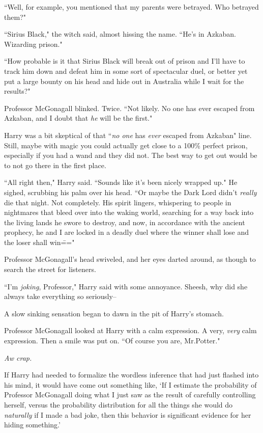 ``Well, for example, you mentioned that my parents were betrayed. Who betrayed them?"

``Sirius Black," the witch said, almost hissing the name. ``He's in Azkaban. Wizarding prison."

``How probable is it that Sirius Black will break out of prison and I'll have to track him down and defeat him in some sort of spectacular duel, or better yet put a large bounty on his head and hide out in Australia while I wait for the results?"

Professor McGonagall blinked. Twice. ``Not likely. No one has ever escaped from Azkaban, and I doubt that \emph{he} will be the first."

Harry was a bit skeptical of that ``\emph{no one} has \emph{ever} escaped from Azkaban" line. Still, maybe with magic you could actually get close to a 100\% perfect prison, especially if you had a wand and they did not. The best way to get out would be to not go there in the first place.

``All right then," Harry said. ``Sounds like it's been nicely wrapped up." He sighed, scrubbing his palm over his head. ``Or maybe the Dark Lord didn't \emph{really} die that night. Not completely. His spirit lingers, whispering to people in nightmares that bleed over into the waking world, searching for a way back into the living lands he swore to destroy, and now, in accordance with the ancient prophecy, he and I are locked in a deadly duel where the winner shall lose and the loser shall win\==="

Professor McGonagall's head swiveled, and her eyes darted around, as though to search the street for listeners.

``I'm \emph{joking}, Professor," Harry said with some annoyance. Sheesh, why did she always take everything so seriously\---

A slow sinking sensation began to dawn in the pit of Harry's stomach.

Professor McGonagall looked at Harry with a calm expression. A very, \emph{very} calm expression. Then a smile was put on. ``Of course you are, Mr.\?Potter."

\emph{Aw crap.}

If Harry had needed to formalize the wordless inference that had just flashed into his mind, it would have come out something like, `If I estimate the probability of Professor McGonagall doing what I just saw as the result of carefully controlling herself, versus the probability distribution for all the things she would do \emph{naturally} if I made a bad joke, then this behavior is significant evidence for her hiding something.'

